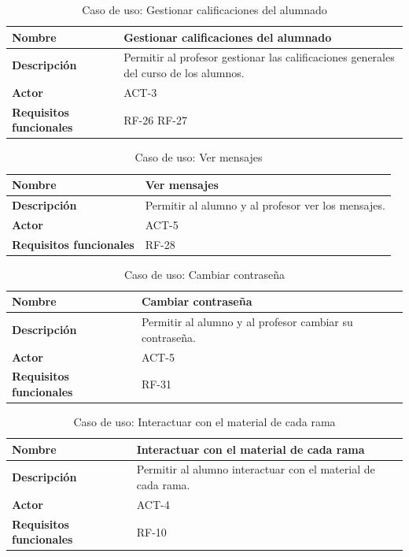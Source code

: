 \begin{table}[H]
\centering
\begin{tabularx}{\textwidth}{
  |>{\centering\arraybackslash}l
  |>{\centering\arraybackslash}X|}
\hline
\textbf{Nombre} & {\textbf{Gestionar calificaciones del alumnado}} \\ \hline

\textbf{Descripción} & Permitir al profesor gestionar las calificaciones generales del curso de los alumnos. \\ \hline
\textbf{Actor} & ACT-3\\ \hline
\textbf{Requisitos funcionales} & RF-26 RF-27\\ \hline
\end{tabularx}
\caption{Caso de uso: Gestionar calificaciones del alumnado}
\end{table}
\begin{table}[H]
\centering
\begin{tabularx}{\textwidth}{
  |>{\centering\arraybackslash}l
  |>{\centering\arraybackslash}X|}
\hline
\textbf{Nombre} & {\textbf{Ver mensajes}} \\ \hline

\textbf{Descripción} & Permitir al alumno y al profesor ver los mensajes. \\ \hline
\textbf{Actor} & ACT-5\\ \hline
\textbf{Requisitos funcionales} & RF-28\\ \hline
\end{tabularx}
\caption{Caso de uso: Ver mensajes}
\end{table}
\begin{table}[H]
\centering
\begin{tabularx}{\textwidth}{
  |>{\centering\arraybackslash}l
  |>{\centering\arraybackslash}X|}
\hline
\textbf{Nombre} & {\textbf{Cambiar contraseña}} \\ \hline

\textbf{Descripción} & Permitir al alumno y al profesor cambiar su contraseña. \\ \hline
\textbf{Actor} & ACT-5\\ \hline
\textbf{Requisitos funcionales} & RF-31\\ \hline
\end{tabularx}
\caption{Caso de uso: Cambiar contraseña}
\end{table}
\begin{table}[H]
\centering
\begin{tabularx}{\textwidth}{
  |>{\centering\arraybackslash}l
  |>{\centering\arraybackslash}X|}
\hline
\textbf{Nombre} & {\textbf{Interactuar con el material de cada rama}} \\ \hline

\textbf{Descripción} & Permitir al alumno interactuar con el material de cada rama. \\ \hline
\textbf{Actor} & ACT-4\\ \hline
\textbf{Requisitos funcionales} & RF-10\\ \hline
\end{tabularx}
\caption{Caso de uso: Interactuar con el material de cada rama}
\end{table}
